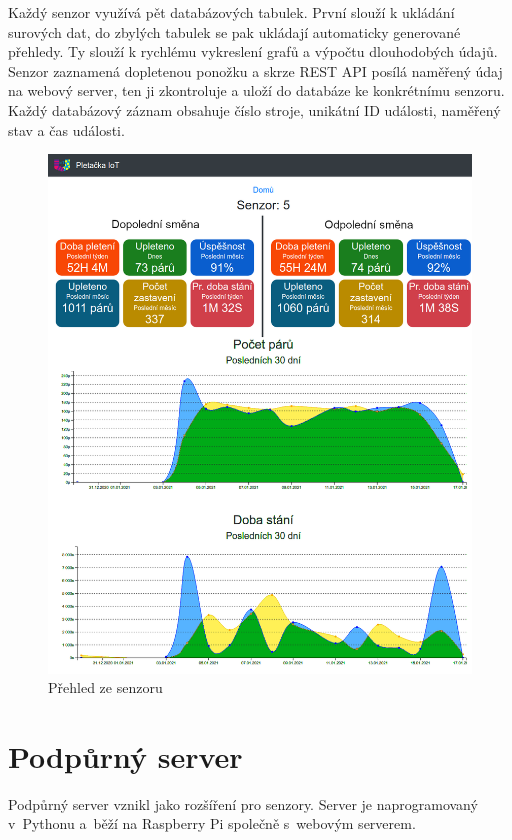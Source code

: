 \documentclass{template/socthesis}
\begin{document}
Každý senzor využívá pět databázových tabulek. První slouží k ukládání surových dat, do zbylých tabulek se pak ukládají automaticky generované přehledy.
Ty slouží k rychlému vykreslení grafů a výpočtu dlouhodobých údajů.
Senzor zaznamená dopletenou ponožku a skrze REST API posílá naměřený údaj na webový server, ten ji zkontroluje a uloží do databáze ke konkrétnímu senzoru.
Každý databázový záznam obsahuje číslo stroje, unikátní ID události, naměřený stav a čas události.

\begin{figure}[htbp]
    \centering
    \includegraphics[width=\textwidth]{img/prehled.png}
    \caption{Přehled ze senzoru}
    \label{fig:webSenzory}
\end{figure}


\section{Podpůrný server}
Podpůrný server vznikl jako rozšíření pro senzory.
Server je naprogramovaný v~Pythonu a~běží na Raspberry Pi společně s~webovým serverem.\newline
\end{document}
